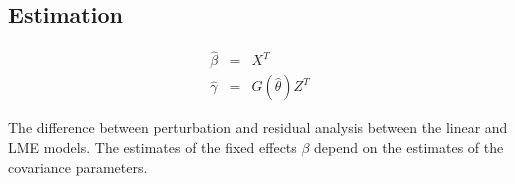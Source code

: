 \documentclass[12pt, a4paper]{report}
\theoremstyle{plain}
\theoremstyle{definition}
\theoremstyle{remark}
\begin{document}
\subsection{Estimation}

\begin{eqnarray}
\hat{\beta} &=& X^{T} \\
\hat{\gamma} &=& G(\hat{\theta})Z^{T}
\end{eqnarray}

The difference between perturbation and residual analysis between the linear and LME models.
The estimates of the fixed effects $\beta$ depend on the estimates of the covariance parameters.
	
	

	
	
\end{document}
